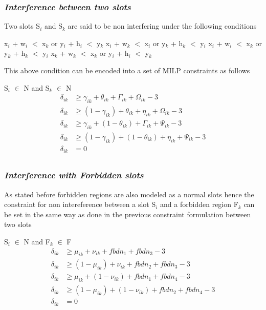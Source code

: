 \subsubsection*{\textit {Interference between two slots}}
Two slots S$_i$ and S$_k$ are said to be non interfering under the following conditions
\begin{algorithmic}
	\STATE x$_i$ + w$_i$ $<$ x$_k$ or y$_i$ + h$_i$ $<$ y$_k$
	\STATE x$_i$ + w$_k$ $<$ x$_i$ or y$_k$ + h$_k$ $<$ y$_i$
	\STATE x$_i$ + w$_i$ $<$ x$_k$ or y$_k$ + h$_k$ $<$ y$_i$
\ELSE
	\STATE x$_k$ + w$_k$ $<$ x$_k$ or y$_i$ + h$_i$ $<$ y$_k$
\ENDIF
\end{algorithmic}

This above condition can be encoded into a set of MILP constraints as follows \\
\begin{constraint} S$_i$ $\in$ N and S$_k$ $\in$ N
\begin{equation} 
\begin{split}
\delta_{ik} & \geq \gamma_{ik} + \theta_{ik} + \Gamma_{ik} + \Omega_{ik} - 3 \\
\delta_{ik} & \geq (1 - \gamma_{ik}) + \theta_{ik} + \eta_{ik} + \Omega_{ik} - 3 \\
\delta_{ik} & \geq \gamma_{ik} +(1 - \theta_{ik}) + \Gamma_{ik} + \Psi_{ik} - 3 \\
\delta_{ik} & \geq (1 - \gamma_{ik}) + (1 - \theta_{ik}) + \eta_{ik} + \Psi_{ik} - 3 \\
\delta_{ik} & = 0 \\
\end{split}
\end{equation}
\end{constraint}

\subsubsection{\textit {Interference with Forbidden slots}}

As stated before forbidden regions are also modeled as a normal slots hence the constraint for non intereference between a slot S$_i$ and a forbidden region F$_k$ can be set in the same way as done in the previous constraint formulation between two slots

\begin{constraint} S$_i$ $\in$ N and F$_k$ $\in$ F
\begin{equation}
\begin{split}
\delta_{ik} & \geq \mu_{ik} + \nu_{ik} + fbdn_1 + fbdn_3 - 3 \\
\delta_{ik} & \geq (1 - \mu_{ik}) + \nu_{ik} + fbdn_2 + fbdn_3 - 3 \\
\delta_{ik} & \geq \mu_{ik} + (1 - \nu_{ik}) + fbdn_1 + fbdn_4 - 3 \\
\delta_{ik} & \geq (1 - \mu_{ik}) + (1 - \nu_{ik}) + fbdn_2 + fbdn_4 - 3 \\
\delta_{ik} & = 0 \\
\end{split}
\end{equation}
\end{constraint}